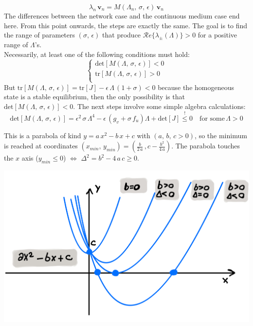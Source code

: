 {\begin{equation}
    \lambda_n\, \mathbf{v}_n = M(\Lambda_n,\,\sigma,\,\epsilon)\, \mathbf{v}_n
    \label{eq:eigenvalue_problem}
\end{equation}
The differences between the network case and the continuous medium case end here. From this point onwards, the steps are exactly the same. The goal is to find the range of parameters $(\sigma,\, \epsilon)$ that produce $\mathcal{R}e\{\lambda_{\pm}(\Lambda)\}>0$ for a positive range of $\Lambda$'s. \\
Necessarily, at least one of the following conditions must hold:
\begin{equation*}
    \begin{cases}
        \text{det}[M(\Lambda,\,\sigma,\,\epsilon)]<0 \\
        \text{tr}[M(\Lambda,\,\sigma,\,\epsilon)]> 0 \\
    \end{cases}
\end{equation*}
But $\text{tr}[M(\Lambda,\,\sigma,\,\epsilon)] = \text{tr}[J] - \epsilon\, \Lambda\, (1+\sigma)<0$ because the homogeneous state is a stable equilibrium, then the only possibility is that $\text{det}[M(\Lambda,\,\sigma,\,\epsilon)]< 0$. The next steps involve some simple algebra calculations:
\begin{equation*}
    \text{det}[M(\Lambda,\,\sigma,\,\epsilon)] = \epsilon^2\,\sigma\,\Lambda^4 - \epsilon\,(g_v +\sigma\,f_u) \Lambda + \text{det}[J] \overset{!}{\leq} 0 \quad \text{for some}\, \Lambda >0
\end{equation*}
\begin{minipage}{0.6\textwidth}
This is a parabola of kind $y = a\,x^2 - b\,x + c$ with  $(a,\,b,\,c>0)$, so the minimum is reached at coordinates $(x_{min},\,y_{min}) = (\frac{b}{2\,a}\,, c-\frac{b^2}{4\,a})$. The parabola touches the $x$ axis ($y_{min}\leq 0$) $\iff$ $\Delta^2 = b^2-4\,a\,c \geq 0$.
\end{minipage}
\hfill
\begin{minipage}{0.38\textwidth}
    \centering
    \includegraphics[width=\textwidth]{latex_source/images/turing/parable.jpeg}

\end{minipage}}
